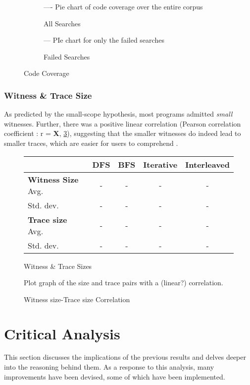 \begin{figure}\centering
\begin{subfigure}{.5\textwidth}
---- Pie chart of code coverage over the entire corpus
\caption{All Searches}
\end{subfigure}
\begin{subfigure}{.5\textwidth}
--- PIe chart for only the failed searches
\caption{Failed Searches}
\end{subfigure}
\caption{Code Coverage}
\label{fig:CodeCoverage}
\end{figure}

\subsubsection{Witness \& Trace Size}
As predicted by the small-scope hypothesis, most programs admitted \textit{small} witnesses. Further, there was a positive linear correlation (Pearson correlation coefficient \cite{PearsonCorrelation}: r = \textbf{X}, \cref{fig:WitnessTraceCorrelation}), suggesting that the smaller witnesses do indeed lead to smaller traces, which are easier for users to comprehend \cite{SmallerTraces}.

\begin{figure}\centering
\begin{tabular}{l|cccc}
& DFS & BFS & Iterative & Interleaved\\
\hline
\textbf{Witness Size} Avg. & -& -& -& -\\
Std. dev. & -& -& -& -\\
\textbf{Trace size} Avg. & -& -& -& -\\
Std. dev. & -& -& -& -
\end{tabular}
\caption{Witness \& Trace Sizes}
\label{fig:WitnessSize}
\end{figure}

\begin{figure}\centering
Plot graph of the size and trace pairs with a (linear?) correlation.
\caption{Witness size-Trace size Correlation}
\label{fig:WitnessTraceCorrelation}
\end{figure}



\section{Critical Analysis}\label{sec:CriticalAnalysis}
This section discusses the implications of the previous results and delves deeper into the reasoning behind them. As a response to this analysis, many improvements have been devised, some of which have been implemented.
